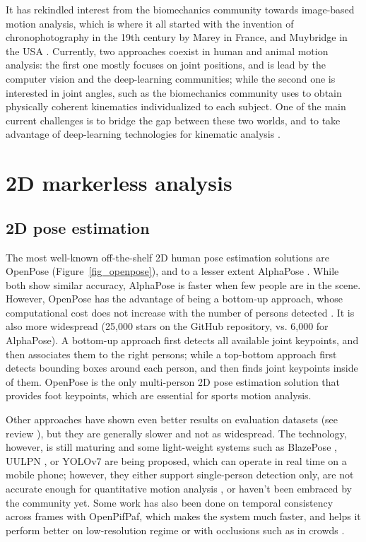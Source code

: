 It has rekindled interest from the biomechanics community towards image-based motion analysis, which is where it all started with the invention of chronophotography in the 19th century by Marey in France, and Muybridge in the USA \cite{Baker2007}. Currently, two approaches coexist in human and animal motion analysis: the first one mostly focuses on joint positions, and is lead by the computer vision and the deep-learning communities; while the second one is interested in joint angles, such as the biomechanics community uses to obtain physically coherent kinematics individualized to each subject. One of the main current challenges is to bridge the gap between these two worlds, and to take advantage of deep-learning technologies for kinematic analysis \cite{Cronin2021,Seethapathi2019}. 

\FloatBarrier
\section{2D markerless analysis}
\subsection{2D pose estimation}

The most well-known off-the-shelf 2D human pose estimation solutions are OpenPose \cite{Cao2019} (Figure~\ref{fig_openpose}), and to a lesser extent AlphaPose \cite{Fang2017}. While both show similar accuracy, AlphaPose is faster when few people are in the scene. However, OpenPose has the advantage of being a bottom-up approach, whose computational cost does not increase with the number of persons detected \cite{Cao2019}. It is also more widespread (25,000 stars on the GitHub repository, vs. 6,000 for AlphaPose). A bottom-up approach first detects all available joint keypoints, and then associates them to the right persons; while a top-bottom approach first detects bounding boxes around each person, and then finds joint keypoints inside of them. OpenPose is the only multi-person 2D pose estimation solution that provides foot keypoints, which are essential for sports motion analysis.

Other approaches have shown even better results on evaluation datasets (see review \cite{Chen2020}), but they are generally slower and not as widespread. The technology, however, is still maturing and some light-weight systems such as BlazePose \cite{Bazarevsky2020}, UULPN \cite{Wang2022a}, or YOLOv7 \cite{Wang2022b} are being proposed, which can operate in real time on a mobile phone; however, they either support single-person detection only, are not accurate enough for quantitative motion analysis \cite{Mroz2021}, or haven't been embraced by the community yet. Some work has also been done on temporal consistency across frames with OpenPifPaf, which makes the system much faster, and helps it perform better on low-resolution regime or with occlusions such as in crowds \cite{Kreiss2021}.

